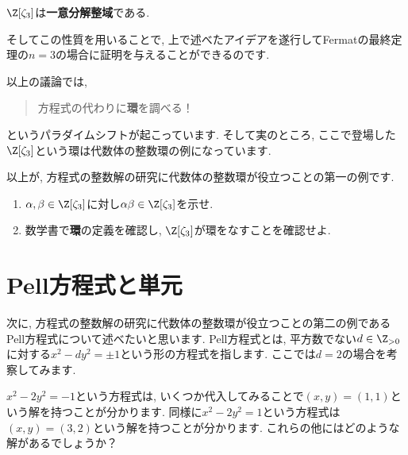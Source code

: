 \documentclass[11pt,b5paper,oneside,titlepage,lualatex]{ltjsreport}
\numberwithin{equation}{section} %
\begin{document}
\begin{thm}{\cite[定理8.6.1]{Yukie1}}{}
	$ \Z[\zeta_3] $は\textbf{一意分解整域}である.
\end{thm}

そしてこの性質を用いることで, 上で述べたアイデアを遂行してFermatの最終定理の$ n=3 $の場合に証明を与えることができるのです. 

以上の議論では, 
\begin{quote}
	\centering
	方程式の代わりに\textbf{環}を調べる！
\end{quote}
というパラダイムシフトが起こっています. 
そして実のところ, ここで登場した$ \Z[\zeta_3] $という環は代数体の整数環の例になっています. 

以上が, 方程式の整数解の研究に代数体の整数環が役立つことの第一の例です. 

\begin{exc}{}{}
	\begin{enumerate}
		\item $ \alpha, \beta \in \Z[\zeta_3] $に対し$ \alpha \beta \in \Z[\zeta_3] $を示せ. 
		\item 数学書で\textbf{環}の定義を確認し, $ \Z[\zeta_3] $が環をなすことを確認せよ. 
	\end{enumerate}
\end{exc}


\section{Pell方程式と単元} \label{sec:Pell方程式と単元}


次に, 方程式の整数解の研究に代数体の整数環が役立つことの第二の例であるPell方程式について述べたいと思います. 
Pell方程式とは, 平方数でない$ d \in \Z_{>0} $に対する$ x^2 - dy^2 = \pm 1 $という形の方程式を指します. 
ここでは$ d = 2 $の場合を考察してみます. 

$ x^2 - 2y^2 = -1 $という方程式は, いくつか代入してみることで$ (x, y) = (1, 1) $という解を持つことが分かります. 
同様に$ x^2 - 2y^2 = 1 $という方程式は$ (x, y) = (3, 2) $という解を持つことが分かります. 
これらの他にはどのような解があるでしょうか？
\end{document}
